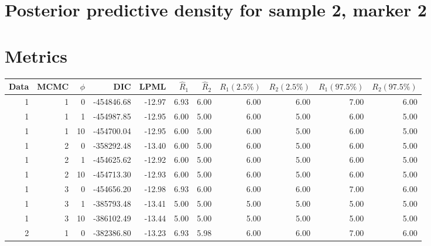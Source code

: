 \documentclass[10pt]{article} %
\begin{document}
\newpage
\section{Posterior predictive density for sample 2, marker 2}
\begin{figure}[H]
  \begin{center}  %
  \end{center}
  \label{fig:dd22}
\end{figure}

\newpage
\section{Metrics}
\begin{table}[H]
\centering
\begin{tabular}{rrrrrrrrrrr}
  \hline
  \rule{0pt}{2.6ex}
  Data & MCMC & $\phi$ & DIC & LPML & $\hat{R}_1$ & $\hat{R}_2$ & $R_1 (2.5\%)$ & $R_2 (2.5\%)$ & $R_1 (97.5\%)$ & $R_2 (97.5\%)$\\
  \hline
  1 &   1 &   0 & -454846.68 & -12.97 & 6.93 & 6.00 & 6.00 & 6.00 & 7.00 & 6.00 \\
  1 &   1 &   1 & -454987.85 & -12.95 & 6.00 & 5.00 & 6.00 & 5.00 & 6.00 & 5.00 \\
  1 &   1 &  10 & -454700.04 & -12.95 & 6.00 & 5.00 & 6.00 & 5.00 & 6.00 & 5.00 \\
  \hline                                            
  1 &   2 &   0 & -358292.48 & -13.40 & 6.00 & 5.00 & 6.00 & 5.00 & 6.00 & 5.00 \\
  1 &   2 &   1 & -454625.62 & -12.92 & 6.00 & 5.00 & 6.00 & 5.00 & 6.00 & 5.00 \\
  1 &   2 &  10 & -454713.30 & -12.93 & 6.00 & 5.00 & 6.00 & 5.00 & 6.00 & 5.00 \\
  \hline                                            
  1 &   3 &   0 & -454656.20 & -12.98 & 6.93 & 6.00 & 6.00 & 6.00 & 7.00 & 6.00 \\
  1 &   3 &   1 & -385793.48 & -13.41 & 5.00 & 5.00 & 5.00 & 5.00 & 5.00 & 5.00 \\
  1 &   3 &  10 & -386102.49 & -13.44 & 5.00 & 5.00 & 5.00 & 5.00 & 5.00 & 5.00 \\
  \hline                                            
  \hline                                            
  2 &   1 &   0 & -382386.80 & -13.23 & 6.93 & 5.98 & 6.00 & 6.00 & 7.00 & 6.00 \\

\end{tabular}
\end{table}
\end{document}
